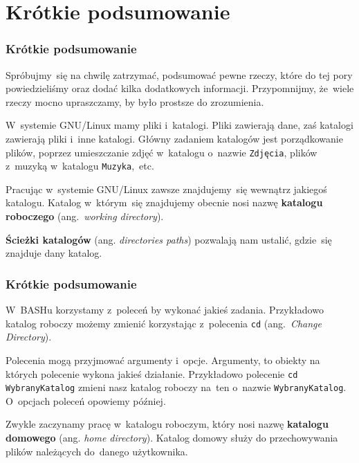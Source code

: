 \documentclass[10pt,t]{beamer}
\begin{document}
\section{Krótkie podsumowanie}


\begin{frame}
  \frametitle{Krótkie podsumowanie}


  Spróbujmy~się na chwilę zatrzymać, podsumować pewne rzeczy, które do
  tej pory powiedzieliśmy oraz dodać kilka dodatkowych informacji.
  Przypomnijmy, że~wiele rzeczy mocno upraszczamy, by było prostsze do
  zrozumienia.

  W~systemie GNU/Linux mamy pliki i~katalogi. Pliki zawierają dane,
  zaś katalogi zawierają pliki i~inne katalogi. Główny zadaniem katalogów
  jest porządkowanie plików, poprzez umieszczanie zdjęć w~katalogu o~nazwie
  \texttt{Zdjęcia}, plików z~muzyką w~katalogu \texttt{Muzyka},~etc.

  Pracując w~systemie GNU/Linux zawsze znajdujemy~się wewnątrz jakiegoś
  katalogu. Katalog w~którym~się znajdujemy obecnie nosi nazwę
  \textbf{katalogu roboczego} (ang.~\textit{working directory}).

  \textbf{Ścieżki katalogów} (ang. \textit{directories paths}) pozwalają
  nam ustalić, gdzie~się znajduje dany katalog.

\end{frame}





\begin{frame}
  \frametitle{Krótkie podsumowanie}


  W~BASHu korzystamy z~poleceń by wykonać jakieś zadania. Przykładowo
  katalog roboczy możemy zmienić korzystając z~polecenia \texttt{cd}
  (ang.~\textit{Change Directory}).

  Polecenia mogą przyjmować argumenty i~opcje. Argumenty, to obiekty
  na których polecenie wykona jakieś działanie. Przykładowo polecenie
  \texttt{cd WybranyKatalog} zmieni nasz katalog roboczy na~ten
  o~nazwie \texttt{WybranyKatalog}. O~opcjach poleceń opowiemy później.

  Zwykle zaczynamy pracę w~katalogu roboczym, który nosi nazwę
  \textbf{katalogu domowego} (ang. \textit{home directory}). Katalog
  domowy służy do przechowywania plików należących do~danego użytkownika.

\end{frame}
\end{document}
